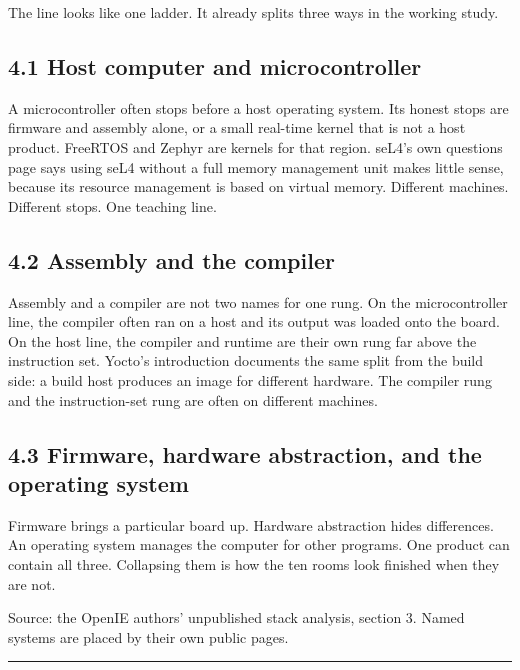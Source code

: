 \documentclass[10pt,letterpaper]{article}
\begin{document}
The line looks like one ladder. It already splits three ways in the
working study.

\subsection{4.1 Host computer and
microcontroller}\label{host-computer-and-microcontroller}

A microcontroller often stops before a host operating system. Its honest
stops are firmware and assembly alone, or a small real-time kernel that
is not a host product. FreeRTOS and Zephyr are kernels for that region.
seL4's own questions page says using seL4 without a full memory
management unit makes little sense, because its resource management is
based on virtual memory. Different machines. Different stops. One
teaching line.

\subsection{4.2 Assembly and the
compiler}\label{assembly-and-the-compiler}

Assembly and a compiler are not two names for one rung. On the
microcontroller line, the compiler often ran on a host and its output
was loaded onto the board. On the host line, the compiler and runtime
are their own rung far above the instruction set. Yocto's introduction
documents the same split from the build side: a build host produces an
image for different hardware. The compiler rung and the instruction-set
rung are often on different machines.

\subsection{4.3 Firmware, hardware abstraction, and the operating
system}\label{firmware-hardware-abstraction-and-the-operating-system}

Firmware brings a particular board up. Hardware abstraction hides
differences. An operating system manages the computer for other
programs. One product can contain all three. Collapsing them is how the
ten rooms look finished when they are not.

Source: the OpenIE authors' unpublished stack analysis, section 3. Named
systems are placed by their own public pages.

\begin{center}\rule{0.5\linewidth}{0.5pt}\end{center}
\end{document}
